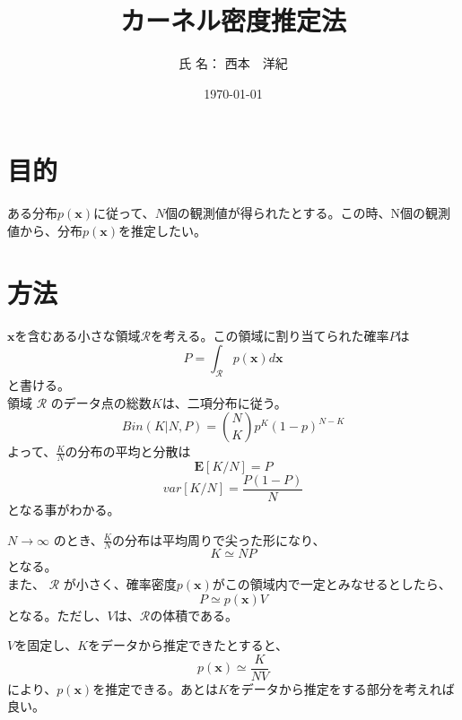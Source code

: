 \documentclass[11pt,a4paper]{jsarticle}
\begin{document}
\title{カーネル密度推定法}
\author{氏 名： 西本　洋紀 }
\date{\today}
\maketitle
\section{目的}
ある分布$p(\mathbf{x})$に従って、$N$個の観測値が得られたとする。この時、N個の観測値から、分布$p(\mathbf{x})$を推定したい。
\section{方法}
$\mathbf{x}$を含むある小さな領域$\mathcal{R}$を考える。この領域に割り当てられた確率$P$は
\begin{equation}
  P = \int_\mathcal{R}p(\mathbf{x})d\mathbf{x}
\end{equation}
と書ける。\\
領域
$\mathcal{R}$
のデータ点の総数$K$は、二項分布に従う。
\begin{equation}
  Bin(K | N, P) = \binom{N}{K} p^K (1 - p)^{N-K}
\end{equation}
よって、$\frac{K}{N}$の分布の平均と分散は
\begin{equation}
  \mathbf{E}[K/N] = P
\end{equation}
\begin{equation}
  var[K/N] = \frac{P(1 - P)}{N}
\end{equation}
となる事がわかる。

$N  \to \infty$ のとき、$\frac{K}{N}$の分布は平均周りで尖った形になり、
\begin{equation}
  K \simeq NP
\end{equation}
となる。\\
また、
$\mathcal{R}$
が小さく、確率密度$p(\mathbf{x})$がこの領域内で一定とみなせるとしたら、
\begin{equation}
  P\simeq p(\mathbf{x})V
\end{equation}
となる。ただし、$V$は、$\mathcal{R}$の体積である。

$V$を固定し、$K$をデータから推定できたとすると、
\begin{equation}
  p(\mathbf{x}) \simeq \frac{K}{NV}
\end{equation}
により、$p(\mathbf{x})$を推定できる。あとは$K$をデータから推定をする部分を考えれば良い。
\end{document}
